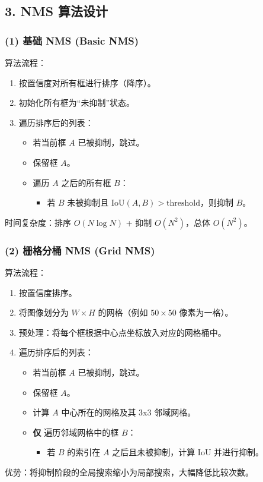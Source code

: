\documentclass[a4paper,12pt]{ctexart}
\begin{document}
\subsection{3. NMS 算法设计}

\subsubsection{(1) 基础 NMS (Basic NMS)}
算法流程：
\begin{enumerate}
    \item 按置信度对所有框进行排序（降序）。
    \item 初始化所有框为“未抑制”状态。
    \item 遍历排序后的列表：
    \begin{itemize}
        \item 若当前框 $A$ 已被抑制，跳过。
        \item 保留框 $A$。
        \item 遍历 $A$ 之后的所有框 $B$：
        \begin{itemize}
            \item 若 $B$ 未被抑制且 $\text{IoU}(A, B) > \text{threshold}$，则抑制 $B$。
        \end{itemize}
    \end{itemize}
\end{enumerate}
时间复杂度：排序 $O(N \log N)$ + 抑制 $O(N^2)$，总体 $O(N^2)$。

\subsubsection{(2) 栅格分桶 NMS (Grid NMS)}
算法流程：
\begin{enumerate}
    \item 按置信度排序。
    \item 将图像划分为 $W \times H$ 的网格（例如 $50 \times 50$ 像素为一格）。
    \item 预处理：将每个框根据中心点坐标放入对应的网格桶中。
    \item 遍历排序后的列表：
    \begin{itemize}
        \item 若当前框 $A$ 已被抑制，跳过。
        \item 保留框 $A$。
        \item 计算 $A$ 中心所在的网格及其 3x3 邻域网格。
        \item \textbf{仅} 遍历邻域网格中的框 $B$：
        \begin{itemize}
            \item 若 $B$ 的索引在 $A$ 之后且未被抑制，计算 IoU 并进行抑制。
        \end{itemize}
    \end{itemize}
\end{enumerate}
优势：将抑制阶段的全局搜索缩小为局部搜索，大幅降低比较次数。
\end{document}
